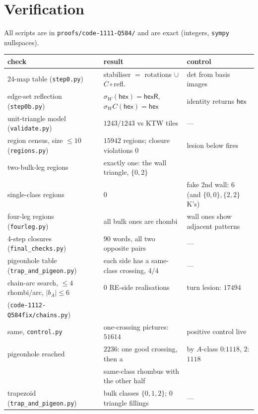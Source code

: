 \documentclass[11pt]{article}
\theoremstyle{definition}
\newcommand{\hex}{\mathsf{hex}}
\newcommand{\hexR}{\mathsf{hexR}}
\begin{document}
\section{Verification}
All scripts are in \texttt{proofs/code-1111-Q584/} and are exact (integers, \texttt{sympy} nullspaces).
\begin{center}\begin{tabular}{lll}\toprule
check & result & control \\ \midrule
24-map table (\texttt{step0.py}) & stabiliser $=$ rotations $\cup$ $C\circ$refl. & det from basis images\\
edge-set reflection (\texttt{step0b.py}) & $\sigma_W(\hex)=\hexR$, $\sigma_WC(\hex)=\hex$ & identity returns $\hex$\\
unit-triangle model (\texttt{validate.py}) & $1243/1243$ vs KTW tiles & ---\\
region census, size $\le10$ (\texttt{regions.py}) & $15942$ regions; closure violations $0$ & lesion below fires\\
\quad two-bulk-leg regions & exactly one: the wall triangle, $\{0,2\}$ & \\
\quad single-class regions & $0$ & fake 2nd wall: $6$ (and $\{0,0\},\{2,2\}$ K's)\\
four-leg regions (\texttt{fourleg.py}) & all bulk ones are rhombi & wall ones show adjacent patterns\\
4-step closures (\texttt{final\_checks.py}) & $90$ words, all two opposite pairs & ---\\
pigeonhole table (\texttt{trap\_and\_pigeon.py}) & each side has a same-class crossing, $4/4$ & ---\\
chain-arc search, $\le4$ rhombi/arc, $|b_A|\le6$ & $0$ RE-side realisations & turn lesion: $17494$\\
\quad (\texttt{code-1112-Q584fix/chains.py}) & & \\
\quad same, \texttt{control.py} & one-crossing pictures: $51614$ & positive control live\\
\quad pigeonhole reached & $2236$: one good crossing, then a & by $A$-class $0$:$1118$, $2$:$1118$\\
 & same-class rhombus with the other half & \\
trapezoid (\texttt{trap\_and\_pigeon.py}) & bulk classes $\{0,1,2\}$; $0$ triangle fillings & ---\\
\bottomrule\end{tabular}\end{center}
\end{document}
